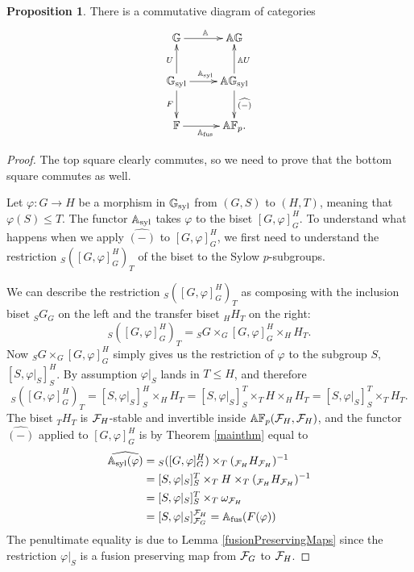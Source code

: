 \documentclass[10pt]{amsart}
\theoremstyle{definition}
\newtheorem{proposition}[theorem]{Proposition}
\renewcommand{\phi}{\varphi}
\begin{document}
\begin{proposition} \label{comparegroupsandburnside}
There is a commutative diagram of categories
\[
\xymatrix{\G \ar[r]^{\A}  & \AG \\ \Gs \ar[u]^{U} \ar[r]^{\As} \ar[d]_{F} & \AGs \ar[u]_{\A U} \ar[d]^{\widehat{(-)}} \\ \F \ar[r]_{\Af} & \AF.}
\]
\end{proposition}
\begin{proof}
The top square clearly commutes, so we need to prove that the bottom square commutes as well.

Let $\phi\colon G\to H$ be a morphism in $\mathbb{G}_{\text{syl}}$ from $(G,S)$ to $(H,T)$, meaning that $\phi(S)\leq T$. The functor $\mathbb{A}_{\text{syl}}$ takes $\phi$ to the biset $[G,\phi]_G^H$. To understand what happens when we apply $\widehat{(-)}$ to $[G,\phi]_G^H$, we first need to understand the restriction ${}_S ([G,\phi]_G^H)_T$ of the biset to the Sylow $p$-subgroups.

We can describe the restriction ${}_S ([G,\phi]_G^H)_T$ as composing with the inclusion biset ${}_S G_G$ on the left and the transfer biset ${}_H H_T$ on the right:
\[{}_S ([G,\phi]_G^H)_T = {}_S G \times_G [G,\phi]_G^H \times_H H_T.\]
Now ${}_S G \times_G [G,\phi]_G^H$ simply gives us the restriction of $\phi$ to the subgroup $S$, $[S,\phi|_S]_S^H$. By assumption $\phi|_S$ lands in $T\leq H$, and therefore
\[{}_S ([G,\phi]_G^H)_T = [S,\phi|_S]_S^H \times_H H_T = [S,\phi|_S]_S^T \times_T H\times_H H_T = [S,\phi|_S]_S^T \times_T H_T.\]
The biset ${}_T H_T$ is $\mathcal{F}_H$-stable and invertible inside $\mathbb{A} \mathbb{F}_p(\mathcal{F}_{H},\mathcal{F}_{H})$, and the functor $\widehat{(-)}$ applied to $[G,\phi]_G^H$ is by Theorem \ref{mainthm} equal to
\begin{align*}
\widehat{ \As ( \phi)} &= {}_S ([G,\phi]_G^H) \times_T ({}_{\cF_H} H_{\cF_H})^{-1}
\\ &= [S,\phi|_S]_S^T \times_T H \times_T ({}_{\cF_H} H_{\cF_H})^{-1}
\\ &= [S,\phi|_S]_S^T \times_T \omega_{\cF_H}
\\ &= [S,\phi|_S]_{\cF_G}^{\cF_H} = \Af(F(\phi))
\end{align*}
The penultimate equality is due to Lemma \ref{fusionPreservingMaps} since the restriction $\phi|_S$ is a fusion preserving map from $\mathcal{F}_G$ to $\mathcal{F}_H$.
\end{proof}
\end{document}
